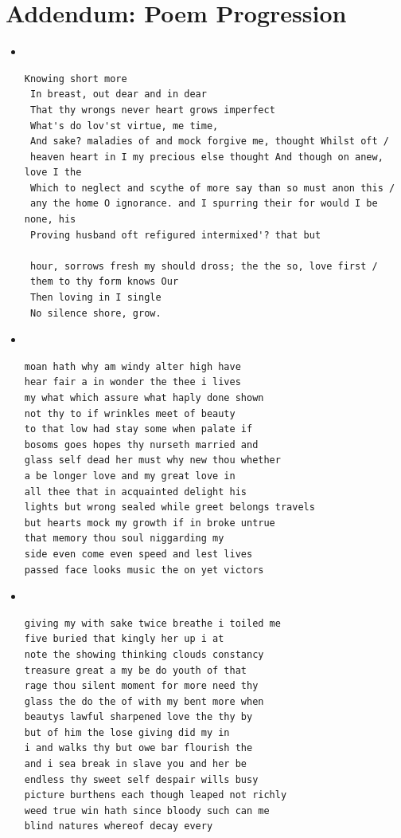 \section{Addendum: Poem Progression}
\medskip
\begin{itemize}



    \item {} \\



\begin{lstlisting}
Knowing short more
 In breast, out dear and in dear
 That thy wrongs never heart grows imperfect
 What's do lov'st virtue, me time,
 And sake? maladies of and mock forgive me, thought Whilst oft /
 heaven heart in I my precious else thought And though on anew, love I the
 Which to neglect and scythe of more say than so must anon this /
 any the home O ignorance. and I spurring their for would I be none, his
 Proving husband oft refigured intermixed'? that but

 hour, sorrows fresh my should dross; the the so, love first /
 them to thy form knows Our
 Then loving in I single
 No silence shore, grow.
\end{lstlisting}

\item {} \\



\begin{lstlisting}
moan hath why am windy alter high have
hear fair a in wonder the thee i lives
my what which assure what haply done shown
not thy to if wrinkles meet of beauty
to that low had stay some when palate if
bosoms goes hopes thy nurseth married and
glass self dead her must why new thou whether
a be longer love and my great love in
all thee that in acquainted delight his
lights but wrong sealed while greet belongs travels
but hearts mock my growth if in broke untrue
that memory thou soul niggarding my
side even come even speed and lest lives
passed face looks music the on yet victors
\end{lstlisting}

\item {} \\




\begin{lstlisting}
giving my with sake twice breathe i toiled me
five buried that kingly her up i at
note the showing thinking clouds constancy
treasure great a my be do youth of that
rage thou silent moment for more need thy
glass the do the of with my bent more when
beautys lawful sharpened love the thy by
but of him the lose giving did my in
i and walks thy but owe bar flourish the
and i sea break in slave you and her be
endless thy sweet self despair wills busy
picture burthens each though leaped not richly
weed true win hath since bloody such can me
blind natures whereof decay every
\end{lstlisting}


\end{itemize}
